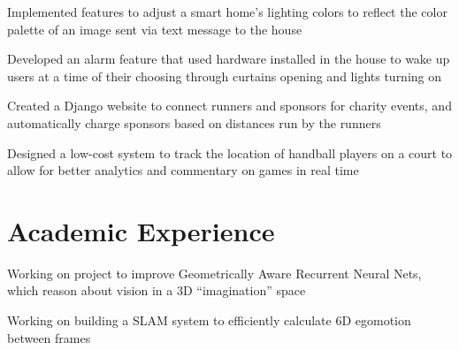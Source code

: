 \documentclass[letterpaper]{deedy-resume} %
\begin{document}
\begin{minipage}[t]{0.66\textwidth}
\begin{tightitemize}
    \item Implemented features to adjust a smart home's lighting colors to reflect the color palette of an image sent via text message to the house
    \item Developed an alarm feature that used hardware installed in the house to wake up users at a time of their choosing through curtains opening and lights turning on
\end{tightitemize}

\sectionspace %


\begin{tightitemize}
    \item Created a Django website to connect runners and sponsors for charity events, and automatically charge sponsors based on distances run by the runners
    \item Designed a low-cost system to track the location of handball players on a court to allow for better analytics and commentary on games in real time
\end{tightitemize}

\sectionspace %


\section{Academic Experience}


\begin{tightitemize}
  \item Working on project to improve Geometrically Aware Recurrent Neural Nets, which reason about vision in a 3D ``imagination'' space
  \item Working on building a SLAM system to efficiently calculate 6D egomotion between frames
\end{tightitemize}

\sectionspace %


\end{minipage}
\end{document}
